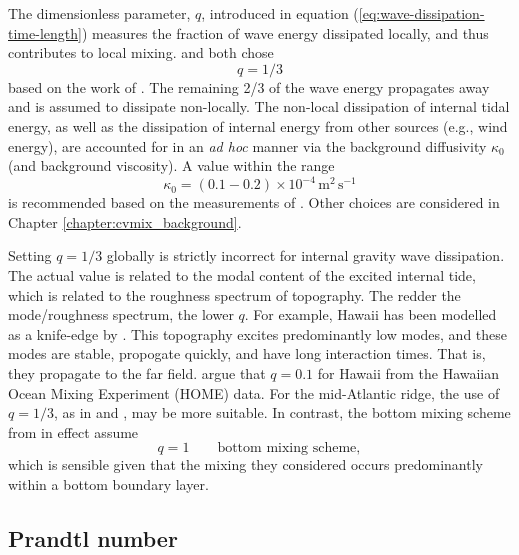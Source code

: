 The dimensionless parameter, $q$, introduced in equation
(\ref{eq:wave-dissipation-time-length}) measures the fraction of wave
energy dissipated locally, and thus contributes to local mixing.
\cite{Simmonsetal2004} and \cite{Melet_etal_2013} both chose
\begin{equation}
  q = 1/3
\end{equation}  
based on the work of \cite{StLaurent_etal2002}.  The remaining 2/3 of
the wave energy propagates away and is assumed to dissipate
non-locally.  The non-local dissipation of internal tidal energy, as
well as the dissipation of internal energy from other sources (e.g.,
wind energy), are accounted for in an {\em ad hoc} manner via the
background diffusivity $\kappa_{0}$ (and background viscosity).  A
value within the range
\begin{equation}
  \kappa_{0} = (0.1 - 0.2) \times 10^{-4} \, \mbox{m}^{2} \, \mbox{s}^{-1}
\end{equation}
is recommended based on the measurements of \cite{Ledwell1993}.  Other
choices are considered in Chapter \ref{chapter:cvmix_background}.

Setting $q = 1/3$ globally is strictly incorrect for internal gravity
wave dissipation. The actual value is related to the modal content of
the excited internal tide, which is related to the roughness spectrum
of topography.  The redder the mode/roughness spectrum, the lower $q$.
For example, Hawaii has been modelled as a knife-edge by
\cite{StLaurent_etal2003}.  This topography excites predominantly low
modes, and these modes are stable, propogate quickly, and have long
interaction times.  That is, they propagate to the far field.
\cite{Klymak_etal2005} argue that $q=0.1$ for Hawaii from the Hawaiian
Ocean Mixing Experiment (HOME) data. For the mid-Atlantic ridge, the
use of $q=1/3$, as in \cite{Simmonsetal2004} and
\cite{Melet_etal_2013}, may be more suitable.  In contrast, the bottom
mixing scheme from \cite{Legg_eta2006} in effect assume
\begin{equation}
 q=1   \qquad \mbox{bottom mixing scheme},
\end{equation}
which is sensible given that the mixing they considered occurs
predominantly within a bottom boundary layer.


\subsection{Prandtl number}

